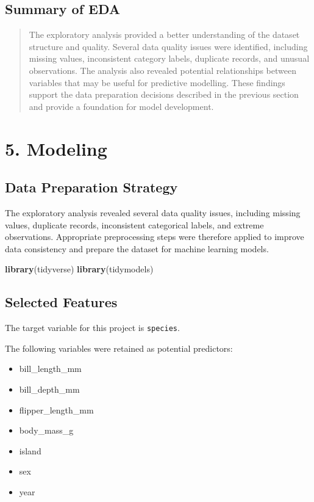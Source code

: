 \documentclass[
]{article}
\newenvironment{Shaded}{\begin{snugshade}}{\end{snugshade}}
\newcommand{\FunctionTok}[1]{\textcolor[rgb]{0.13,0.29,0.53}{\textbf{#1}}}
\newcommand{\NormalTok}[1]{#1}
\providecommand{\tightlist}{%
  \setlength{\itemsep}{0pt}\setlength{\parskip}{0pt}}
\begin{document}
\subsection{Summary of EDA}\label{summary-of-eda}

\begin{quote}
The exploratory analysis provided a better understanding of the dataset
structure and quality. Several data quality issues were identified,
including missing values, inconsistent category labels, duplicate
records, and unusual observations. The analysis also revealed potential
relationships between variables that may be useful for predictive
modelling. These findings support the data preparation decisions
described in the previous section and provide a foundation for model
development.
\end{quote}

\section{5. Modeling}\label{modeling}

\subsection{Data Preparation Strategy}\label{data-preparation-strategy}

The exploratory analysis revealed several data quality issues, including
missing values, duplicate records, inconsistent categorical labels, and
extreme observations. Appropriate preprocessing steps were therefore
applied to improve data consistency and prepare the dataset for machine
learning models.

\begin{Shaded}
\begin{Highlighting}[]
\FunctionTok{library}\NormalTok{(tidyverse)}
\FunctionTok{library}\NormalTok{(tidymodels)}
\end{Highlighting}
\end{Shaded}

\subsection{Selected Features}\label{selected-features}

The target variable for this project is \texttt{species}.

The following variables were retained as potential predictors:

\begin{itemize}
\tightlist
\item
  bill\_length\_mm
\item
  bill\_depth\_mm
\item
  flipper\_length\_mm
\item
  body\_mass\_g
\item
  island
\item
  sex
\item
  year
\end{itemize}
\end{document}
